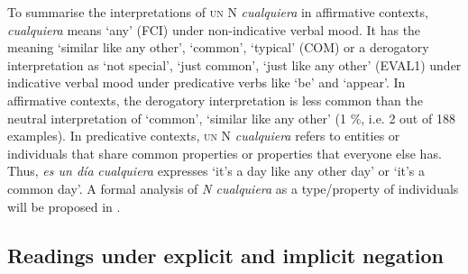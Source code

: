 To summarise the interpretations of \textsc{un} N \textit{cualquiera} in affirmative contexts, \textit{cualquiera} means ‘any’ (FCI) under non-indicative verbal mood. It has the meaning ‘similar like any other’, ‘common’, ‘typical’ (COM) or a derogatory interpretation as ‘not special’, ‘just common’, ‘just like any other’ (EVAL1) under indicative verbal mood under predicative verbs like ‘be’ and ‘appear’. In affirmative contexts, the derogatory interpretation is less common than the neutral interpretation of ‘common’, ‘similar like any other’ (1 \%, i.e. 2 out of 188 examples). In predicative contexts, \textsc{un} N \textit{cualquiera} refers to entities or individuals that share common properties or properties that everyone else has. Thus, \textit{es un día} \textit{cualquiera} expresses ‘it's a day like any other day’ or ‘it's a common day’. A formal analysis of \textit{N cualquiera} as a type/property of individuals will be proposed in .

\subsection{{Readings} {under} {explicit} {and} {implicit} {negation}} \label{sec:3.2.2}

